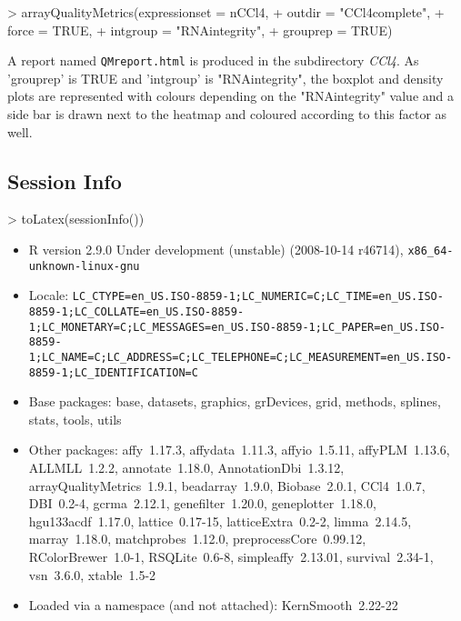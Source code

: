 \documentclass[a4paper]{article}
\begin{document}
%
\begin{Schunk}
\begin{Sinput}
> arrayQualityMetrics(expressionset = nCCl4,
+                     outdir = "CCl4complete",
+                     force = TRUE,
+                     intgroup = "RNAintegrity",
+                     grouprep = TRUE)
\end{Sinput}
\end{Schunk}
%

A report named \texttt{QMreport.html} is produced in the subdirectory \emph{CCl4}. As 'grouprep' is TRUE and 'intgroup' is "RNAintegrity", the boxplot and density plots are represented with colours depending on the "RNAintegrity" value and a side bar is drawn next to the heatmap and coloured according to this factor as well.



\subsection*{Session Info}
%
\begin{Schunk}
\begin{Sinput}
> toLatex(sessionInfo())
\end{Sinput}
\begin{itemize}
  \item R version 2.9.0 Under development (unstable) (2008-10-14 r46714), \verb|x86_64-unknown-linux-gnu|
  \item Locale: \verb|LC_CTYPE=en_US.ISO-8859-1;LC_NUMERIC=C;LC_TIME=en_US.ISO-8859-1;LC_COLLATE=en_US.ISO-8859-1;LC_MONETARY=C;LC_MESSAGES=en_US.ISO-8859-1;LC_PAPER=en_US.ISO-8859-1;LC_NAME=C;LC_ADDRESS=C;LC_TELEPHONE=C;LC_MEASUREMENT=en_US.ISO-8859-1;LC_IDENTIFICATION=C|
  \item Base packages: base, datasets, graphics, grDevices, grid,
    methods, splines, stats, tools, utils
  \item Other packages: affy~1.17.3, affydata~1.11.3, affyio~1.5.11,
    affyPLM~1.13.6, ALLMLL~1.2.2, annotate~1.18.0,
    AnnotationDbi~1.3.12, arrayQualityMetrics~1.9.1, beadarray~1.9.0,
    Biobase~2.0.1, CCl4~1.0.7, DBI~0.2-4, gcrma~2.12.1,
    genefilter~1.20.0, geneplotter~1.18.0, hgu133acdf~1.17.0,
    lattice~0.17-15, latticeExtra~0.2-2, limma~2.14.5, marray~1.18.0,
    matchprobes~1.12.0, preprocessCore~0.99.12, RColorBrewer~1.0-1,
    RSQLite~0.6-8, simpleaffy~2.13.01, survival~2.34-1, vsn~3.6.0,
    xtable~1.5-2
  \item Loaded via a namespace (and not attached): KernSmooth~2.22-22
\end{itemize}\end{Schunk}
%
\end{document}
